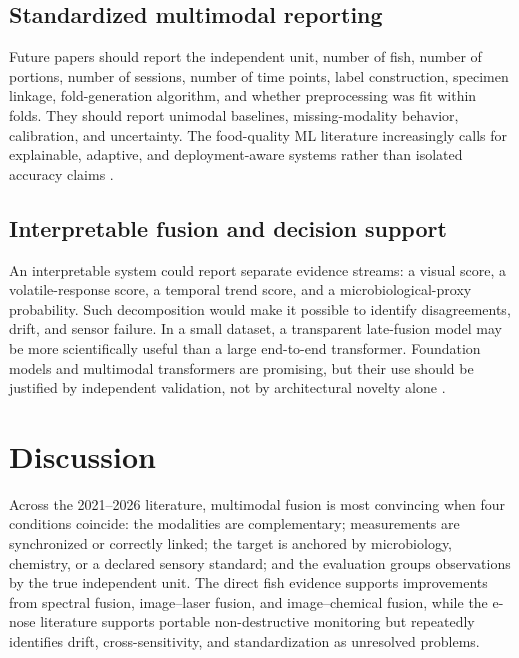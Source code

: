 \documentclass[11pt]{article}
\begin{document}
\subsection{Standardized multimodal reporting}

Future papers should report the independent unit, number of fish, number of portions, number of sessions, number of time points, label construction, specimen linkage, fold-generation algorithm, and whether preprocessing was fit within folds. They should report unimodal baselines, missing-modality behavior, calibration, and uncertainty. The food-quality ML literature increasingly calls for explainable, adaptive, and deployment-aware systems rather than isolated accuracy claims \citep{Liakos2025machine,Sanislav2025comprehensive,Lun2025deep}.

\subsection{Interpretable fusion and decision support}

An interpretable system could report separate evidence streams: a visual score, a volatile-response score, a temporal trend score, and a microbiological-proxy probability. Such decomposition would make it possible to identify disagreements, drift, and sensor failure. In a small dataset, a transparent late-fusion model may be more scientifically useful than a large end-to-end transformer. Foundation models and multimodal transformers are promising, but their use should be justified by independent validation, not by architectural novelty alone \citep{Xu2023multimodal,Chen2026multimodal}.

\section{Discussion}

Across the 2021--2026 literature, multimodal fusion is most convincing when four conditions coincide: the modalities are complementary; measurements are synchronized or correctly linked; the target is anchored by microbiology, chemistry, or a declared sensory standard; and the evaluation groups observations by the true independent unit. The direct fish evidence supports improvements from spectral fusion, image--laser fusion, and image--chemical fusion, while the e-nose literature supports portable non-destructive monitoring but repeatedly identifies drift, cross-sensitivity, and standardization as unresolved problems.
\end{document}
